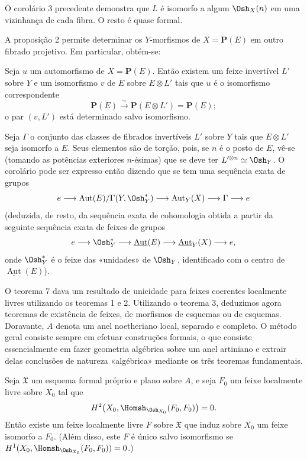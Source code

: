 O corolário 3 precedente demonstra que $L$ é isomorfo a algum $\Osh_X(n)$ em
uma vizinhança de cada fibra. O resto é quase formal.

A proposição 2 permite determinar os $Y$-morfismos de $X=\mathbf P(E)$ em
outro fibrado projetivo. Em particular, obtém-se:

 Seja $u$ um automorfismo de $X=\mathbf P(E)$. Então
existem um feixe invertível $L'$ sobre $Y$ e um isomorfismo $v$ de $E$ sobre
$E\otimes L'$ tais que $u$ é o isomorfismo correspondente
\[
  \mathbf P(E)\xrightarrow{\sim}\mathbf P(E\otimes L')=\mathbf P(E);
\]
o par $(v,L')$ está determinado salvo isomorfismo.

Seja $\Gamma$ o conjunto das classes de fibrados invertíveis $L'$ sobre $Y$
tais que $E\otimes L'$ seja isomorfo a $E$. Seus elementos são de torção, pois,
se $n$ é o posto de $E$, vê-se (tomando as potências exteriores $n$-ésimas)
que se deve ter $L'^{\otimes n}\simeq\Osh_Y$. O corolário pode ser expresso
então dizendo que se tem uma sequência exata de grupos
\[
  e\longrightarrow
  \operatorname{Aut}(E)/\Gamma(Y,\Osh_Y^*)
  \longrightarrow \operatorname{Aut}_Y(X)
  \longrightarrow \Gamma\longrightarrow e
\]
(deduzida, de resto, da sequência exata de cohomologia obtida a partir
da seguinte sequência exata de feixes de grupos
\[
  e\longrightarrow \Osh_Y^*
  \longrightarrow \underline{\operatorname{Aut}}(E)
  \longrightarrow \underline{\operatorname{Aut}}_Y(X)
  \longrightarrow e,
\]
onde $\Osh_Y^*$ é o feixe das «unidades» de $\Osh_Y$, identificado com o
centro de $\underline{\operatorname{Aut}}(E)$).


O teorema 7 dava um resultado de unicidade para feixes coerentes localmente
livres utilizando os teoremas 1 e 2. Utilizando o teorema 3, deduzimos agora
teoremas de existência de feixes, de morfismos de esquemas ou de esquemas.
Doravante, $A$ denota um anel noetheriano local, separado e completo. O método
geral consiste sempre em efetuar construções formais, o que consiste
essencialmente em fazer geometria algébrica sobre um anel artiniano e extrair
delas conclusões de natureza «algébrica» mediante os três teoremas
fundamentais.

 Seja $\mathfrak X$ um esquema formal próprio e plano
sobre $A$, e seja $F_0$ um feixe localmente livre sobre $X_0$ tal que
\[
  H^2\bigl(X_0,\Homsh_{\Osh_{X_0}}(F_0,F_0)\bigr)=0.
\]
Então existe um feixe localmente livre $F$ sobre $\mathfrak X$ que induz
sobre $X_0$ um feixe isomorfo a $F_0$. (Além disso, este $F$ é único salvo
isomorfismo se
$H^1(X_0,\Homsh_{\Osh_{X_0}}(F_0,F_0))=0$.)

